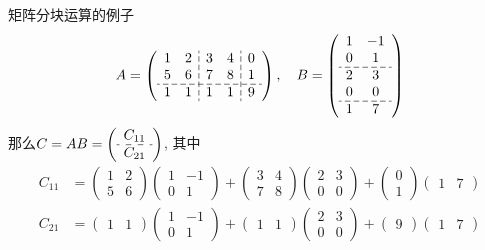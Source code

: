 \begin{frame}

\begin{block}{矩阵分块运算的例子}
\[
  \setlength{\dashlinegap}{2pt}
  A = \left( \begin{array}{cc:cc:c}
    1 & 2 & 3 & 4 & 0 \\
    5 & 6 & 7 & 8 & 1 \\
    \hdashline
    1 & 1 & 1 & 1 & 9 \\
  \end{array} \right), \quad
  B = \left( \begin{array}{cc}
    1 & -1 \\
    0 & 1 \\
    \hdashline
    2 & 3 \\
    0 & 0 \\
    \hdashline
    1 & 7 \\
  \end{array} \right)
\]
那么\(\displaystyle C = AB =
\left( \begin{array}{c}
    C_{11} \\
    \hdashline
    C_{21} \\
  \end{array} \right)\), 其中
\begin{align*}
C_{11} & = \begin{pmatrix} 1 & 2 \\ 5 & 6 \end{pmatrix} \begin{pmatrix} 1 & -1 \\ 0 & 1 \end{pmatrix} +  \begin{pmatrix} 3 & 4 \\ 7 & 8 \end{pmatrix} \begin{pmatrix} 2 & 3 \\ 0 & 0 \end{pmatrix} + \begin{pmatrix} 0 \\ 1 \end{pmatrix} \begin{pmatrix} 1 & 7 \end{pmatrix}\\
C_{21} & = \begin{pmatrix} 1 & 1 \end{pmatrix} \begin{pmatrix} 1 & -1 \\ 0 & 1 \end{pmatrix} +  \begin{pmatrix} 1 & 1 \end{pmatrix} \begin{pmatrix} 2 & 3 \\ 0 & 0 \end{pmatrix} + \begin{pmatrix} 9 \end{pmatrix} \begin{pmatrix} 1 & 7 \end{pmatrix}
\end{align*}
\end{block}

\end{frame}


